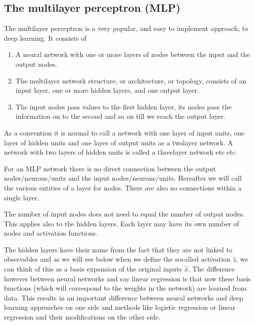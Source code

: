 \documentclass[letterpaper,10pt,english]{sphinxmanual}
\begin{document}
\subsection{The multilayer  perceptron (MLP)}
\label{\detokenize{chapter6:the-multilayer-perceptron-mlp}}
The multilayer perceptron is a very popular, and easy to implement approach, to deep learning. It consists of
\begin{enumerate}
%
\item {} 
A neural network with one or more layers of nodes between the input and the output nodes.

\item {} 
The multilayer network structure, or architecture, or topology, consists of an input layer, one or more hidden layers, and one output layer.

\item {} 
The input nodes pass values to the first hidden layer, its nodes pass the information on to the second and so on till we reach the output layer.

\end{enumerate}

As a convention it is normal to call  a  network with one layer of input units, one layer of hidden
units and one layer of output units as  a two\sphinxhyphen{}layer network. A network with two layers of hidden units is called a three\sphinxhyphen{}layer network etc etc.

For an MLP network there is no direct connection between the output nodes/neurons/units and  the input nodes/neurons/units.
Hereafter we will call the various entities of a layer for nodes.
There are also no connections within a single layer.

The number of input nodes does not need to equal the number of output
nodes. This applies also to the hidden layers. Each layer may have its
own number of nodes and activation functions.

The hidden layers have their name from the fact that they are not
linked to observables and as we will see below when we define the
so\sphinxhyphen{}called activation \(\hat{z}\), we can think of this as a basis
expansion of the original inputs \(\hat{x}\). The difference however
between neural networks and say linear regression is that now these
basis functions (which will correspond to the weights in the network)
are learned from data. This results in  an important difference between
neural networks and deep learning approaches on one side and methods
like logistic regression or linear regression and their modifications on the other side.
\end{document}
